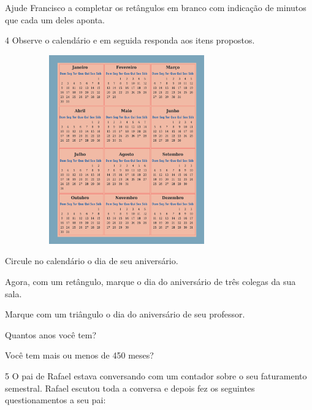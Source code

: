 \begin{multicols}{2}
Ajude Francisco a completar os retângulos em branco com indicação de
minutos que cada um deles aponta.


\num{4} Observe o calendário e em seguida responda aos itens propostos.


\includegraphics[width=4.13369in,height=3.20861in]{media/image54.png}

\begin{escolha}
\item Circule no calendário o dia de seu aniversário.


\item Agora, com um retângulo, marque o dia do aniversário de três colegas da sua sala.


\item Marque com um triângulo o dia do aniversário de seu professor.


\item Quantos anos você tem?


\item Você tem mais ou menos de 450 meses?

\end{escolha}

\num{5} O pai de Rafael estava conversando com um contador sobre o seu
faturamento semestral. Rafael escutou toda a conversa e depois fez os
seguintes questionamentos a seu pai:


\end{multicols}
